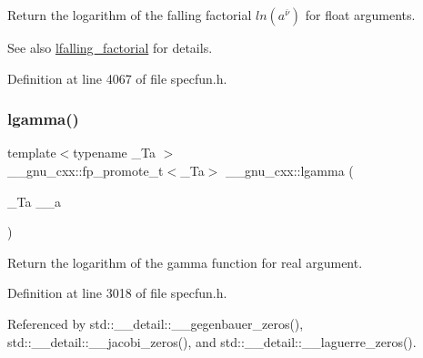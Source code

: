Return the logarithm of the falling factorial $ ln(a^{\overline{\nu}})$ for float arguments.

\begin{DoxySeeAlso}{See also}
\hyperlink{group__mathsf__gnu_ga2032c10640d5010666d60d9faec86c32}{lfalling\+\_\+factorial} for details. 
\end{DoxySeeAlso}


Definition at line 4067 of file specfun.\+h.

\mbox{\label{group__mathsf__gnu_ga40fa5127f7c419ed1d8f1c6a6f96ea9b}} 
\subsubsection{\texorpdfstring{lgamma()}{lgamma()}\hspace{0.1cm}{\footnotesize\ttfamily [1/2]}}
{\footnotesize\ttfamily template$<$typename \+\_\+\+Ta $>$ \\
\+\_\+\+\_\+gnu\+\_\+cxx\+::fp\+\_\+promote\+\_\+t$<$\+\_\+\+Ta$>$ \+\_\+\+\_\+gnu\+\_\+cxx\+::lgamma (\begin{DoxyParamCaption}\item[{\+\_\+\+Ta}]{\+\_\+\+\_\+a }\end{DoxyParamCaption})\hspace{0.3cm}{\ttfamily [inline]}}

Return the logarithm of the gamma function for real argument. 

Definition at line 3018 of file specfun.\+h.



Referenced by std\+::\+\_\+\+\_\+detail\+::\+\_\+\+\_\+gegenbauer\+\_\+zeros(), std\+::\+\_\+\+\_\+detail\+::\+\_\+\+\_\+jacobi\+\_\+zeros(), and std\+::\+\_\+\+\_\+detail\+::\+\_\+\+\_\+laguerre\+\_\+zeros().

\mbox{\label{group__mathsf__gnu_ga93530dc48fbf301835215cdffedc42d8}} 
